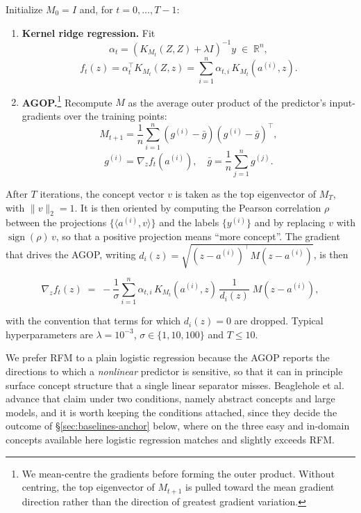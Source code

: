Initialize $M_0 = I$ and, for $t = 0, \dots, T-1$:

\begin{enumerate}
  \item \textbf{Kernel ridge regression.} Fit
  \[
    \alpha_t = \left(K_{M_t}(Z,Z) + \lambda I\right)^{-1} y \;\in\; \mathbb{R}^{n},
  \]
  \[
    f_t(z) = \alpha_t^{\top} K_{M_t}(Z,z) = \sum_{i=1}^{n} \alpha_{t,i}\, K_{M_t}\!\left(a^{(i)}, z\right).
  \]

  \item \textbf{AGOP.}\footnote{We mean-centre the gradients before forming the outer
product. Without centring, the top eigenvector of $M_{t+1}$ is pulled
toward the mean gradient direction rather than the direction of greatest gradient
variation.} Recompute $M$ as the average outer product of the predictor's
  input-gradients over the training points:
  \[
    M_{t+1} = \frac{1}{n}\sum_{i=1}^{n}
      \left(g^{(i)} - \bar{g}\right)\left(g^{(i)} - \bar{g}\right)^{\top},
  \]
  \[
    g^{(i)} = \nabla_z f_t\!\left(a^{(i)}\right),
    \quad \bar{g} = \frac{1}{n}\sum_{j=1}^{n} g^{(j)} .
  \]
\end{enumerate}

After $T$ iterations, the concept vector $v$ is taken as the top eigenvector of $M_T$,
with $\|v\|_2 = 1$. It is then oriented by computing the Pearson correlation $\rho$
between the projections $\{\langle a^{(i)}, v\rangle\}$ and the labels $\{y^{(i)}\}$ and
by replacing $v$ with $\operatorname{sign}(\rho)\, v$, so that a positive projection means
``more concept''. The gradient that drives the AGOP, writing
$d_i(z) = \sqrt{(z - a^{(i)})^{\top} M (z - a^{(i)})}$, is then

\[
  \nabla_z f_t(z) \;=\; -\frac{1}{\sigma}\sum_{i=1}^{n}
    \alpha_{t,i}\, K_{M_t}\!\left(a^{(i)}, z\right)\,
    \frac{1}{d_i(z)}\; M\left(z - a^{(i)}\right),
\]

with the convention that terms for which $d_i(z) = 0$ are dropped. Typical
hyperparameters are $\lambda = 10^{-3}$, $\sigma \in \{1, 10, 100\}$ and $T \leq 10$.

We prefer RFM to a plain logistic regression because the AGOP reports the directions to
which a \emph{nonlinear} predictor is sensitive, so that it can in principle surface
concept structure that a single linear separator misses. Beaglehole et al. advance that
claim under two conditions, namely abstract concepts and large models, and it is worth
keeping the conditions attached, since they decide the outcome of
§\ref{sec:baselines-anchor} below, where on the three easy and in-domain concepts
available here logistic regression matches and slightly exceeds RFM.


